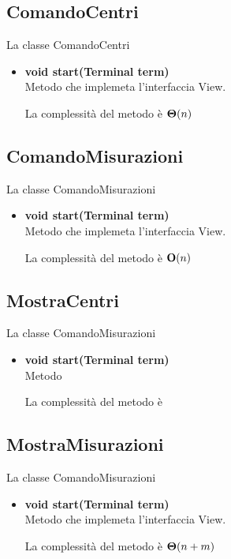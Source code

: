 \documentclass[a4paper, 12pt]{scrreprt}
\begin{document}
			\subsection{ComandoCentri}
			La classe ComandoCentri
			\begin{itemize}
				\item \textbf{void start(Terminal term)}
				\\Metodo che implemeta l'interfaccia View.
				
				La complessit\`a del metodo è $\mathbf{\Theta}(n)$
				
			\end{itemize}
			\subsection{ComandoMisurazioni}
			La classe ComandoMisurazioni
			\begin{itemize}
				\item \textbf{void start(Terminal term)}
				\\Metodo che implemeta l'interfaccia View.
				
				La complessit\`a del metodo è $\mathbf{O}(n)$
				
			\end{itemize}
			
			\subsection{MostraCentri}
			La classe ComandoMisurazioni
			\begin{itemize}
				\item \textbf{void start(Terminal term)}
				\\Metodo
				
				La complessit\`a del metodo è 
				
			\end{itemize}
			
			\subsection{MostraMisurazioni}
			La classe ComandoMisurazioni
			\begin{itemize}
				\item \textbf{void start(Terminal term)}
				\\Metodo che implemeta l'interfaccia View.
				
				La complessit\`a del metodo è $\mathbf{\Theta}(n + m)$
				
			\end{itemize}
\end{document}
